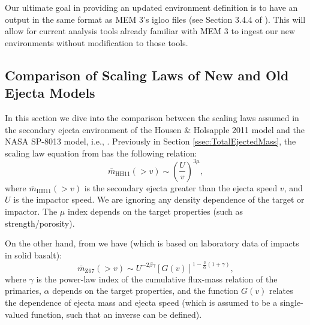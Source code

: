 \documentclass{hitec}
\numberwithin{equation}{section}
\begin{document}
Our ultimate goal in providing an updated environment definition is to have an output in the same format as MEM 3's igloo files (see Section 3.4.4 of \cite{moorhead2019nasa}). This will allow for current analysis tools already familiar with MEM 3 to ingest our new environments without modification to those tools. 


\subsection{Comparison of Scaling Laws of New and Old Ejecta Models}

In this section we dive into the comparison between the scaling laws assumed in the secondary ejecta environment of the Housen \& Holsapple 2011 model and the NASA SP-8013 model, i.e., \cite{zook1967problem}. Previously in Section \ref{ssec:TotalEjectedMass}, the scaling law equation from \cite{housen2011ejecta} has the following relation:
\begin{equation}
\bar{m}_{\text{HH11}}(>v) \sim \left(\frac{U}{v}\right)^{3\mu},
\end{equation}
where $\bar{m}_{\text{HH11}}(>v)$ is the secondary ejecta greater than the ejecta speed $v$, and $U$ is the impactor speed. We are ignoring any density dependence of the target or impactor. The $\mu$ index depends on the target properties (such as strength/porosity).

On the other hand, from \cite{zook1967problem} we have (which is based on laboratory data of impacts in solid basalt):
\begin{equation}\label{eq:m_Z67}
\bar{m}_{\text{Z67}}(>v) \sim U^{-2\beta\gamma}\left[G(v)\right]^{1-\frac{3}{\alpha}(1+\gamma)},
\end{equation}
where $\gamma$ is the power-law index of the cumulative flux-mass relation of the primaries, $\alpha$ depends on the target properties, and the function $G(v)$ \citep[from Figure 10 of][]{gault1963spray} relates the dependence of ejecta mass and ejecta speed (which is assumed to be a single-valued function, such that an inverse can be defined).
\end{document}
